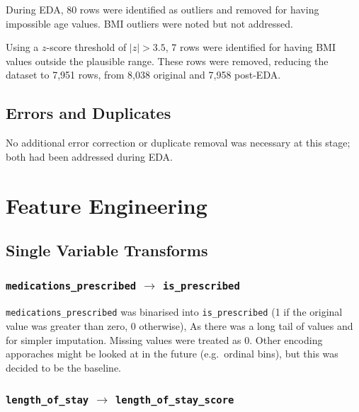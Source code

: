 \documentclass{article}
\begin{document}
\par During EDA, 80 rows were identified as outliers and removed for having impossible age values. BMI outliers were noted but not addressed.

\par Using a $z$-score threshold of $|z| > 3.5$, 7 rows were identified for having BMI values outside the plausible range. These rows were removed,
reducing the dataset to 7,951 rows, from 8,038 original and 7,958 post-EDA.

\subsection{Errors and Duplicates}

\par No additional error correction or duplicate removal was necessary at this stage; both had been addressed during EDA.

\section{Feature Engineering}

\subsection{Single Variable Transforms}
\label{subsec:single-var}

\subsubsection{\texttt{medications\_prescribed} $\to$ \texttt{is\_prescribed}}
\par \texttt{medications\_prescribed} was binarised into \texttt{is\_prescribed} (1 if the original value was greater than zero, 0 otherwise),
As there was a long tail of values and for simpler imputation. Missing values were treated as 0.
Other encoding apporaches might be looked at in the future (e.g.\ ordinal bins),
but this was decided to be the baseline.

\subsubsection{\texttt{length\_of\_stay} $\to$ \texttt{length\_of\_stay\_score}}
\end{document}
